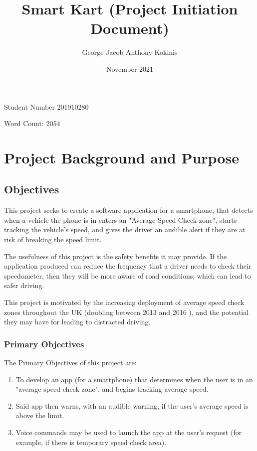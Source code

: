\documentclass[11pt, a4paper, notitlepage]{report}
\title{Smart Kart (Project Initiation Document)}
\date{November 2021}
\author{George Jacob Anthony Kokinis}
\newcounter{objectivesCounter}
\begin{document}
\maketitle
\begin{center}
    Student Number 201910280
    
    Word Count: 2054 %
\end{center}
\newpage

\tableofcontents

\chapter{Project Background and Purpose}
\section{Objectives}
This project seeks to create a software application for a smartphone, that 
detects when a vehicle the phone is in enters an "Average Speed Check zone", 
starts tracking the vehicle's speed, and gives the driver an audible alert if 
they are at risk of breaking the speed limit.

The usefulness of this project is the safety benefits it may provide. If the 
application produced can reduce the frequency that a driver needs to check 
their speedometer, then they will be more aware of road conditions; which can 
lead to safer driving.

This project is motivated by the increasing deployment of average speed check 
zones throughout the UK (doubling between 2013 and 2016 
\citep{BBCSpeedCameraDoubled}), and the potential they may have for leading to 
distracted driving.

\subsection{Primary Objectives}\label{subsec:PrimaryObjectives}
The Primary Objectives of this project are:
\begin{enumerate}
    \item To develop an app (for a smartphone) that determines when the user is 
    in an "average speed check zone", and begins tracking average speed.
    \item Said app then warns, with an audible warning, if the user's average 
    speed is above the limit.
    \item Voice commands may be used to launch the app at the user's request 
    (for example, if there is temporary speed check area).
    \setcounter{objectivesCounter}{\value{enumi}}
\end{enumerate}
\end{document}
